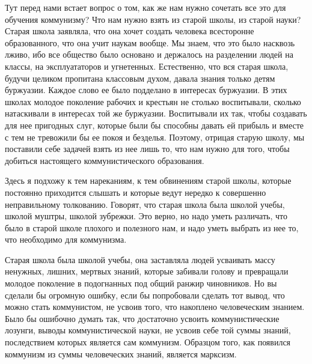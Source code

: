 \documentclass[12pt]{article}
\newcommand{\parnum}{(\arabic{parcount})}
\newcounter{parcount}
\newenvironment{parnumbers}{%
  \par%
  \everypar{\noindent \stepcounter{parcount}\marginpar[]{\parnum}}%
}{}
\begin{document}
\begin{parnumbers}
Тут перед нами встает вопрос о том, как же нам нужно сочетать все это для обучения коммунизму? Что нам нужно взять из старой школы, из старой науки? Старая школа заявляла, что она хочет создать человека всесторонне образованного, что она учит наукам вообще. Мы знаем, что это было насквозь лживо, ибо все общество было основано и держалось на разделении людей на классы, на эксплуататоров и угнетенных. Естественно, что вся старая школа, будучи целиком пропитана классовым духом, давала знания только детям буржуазии. Каждое слово ее было подделано в интересах буржуазии. В этих школах молодое поколение рабочих и крестьян не столько воспитывали, сколько натаскивали в интересах той же буржуазии. Воспитывали их так, чтобы создавать для нее пригодных слуг, которые были бы способны давать ей прибыль и вместе с тем не тревожили бы ее покоя и безделья. Поэтому, отрицая старую школу, мы поставили себе задачей взять из нее лишь то, что нам нужно для того, чтобы добиться настоящего коммунистического образования.

Здесь я подхожу к тем нареканиям, к тем обвинениям старой школы, которые постоянно приходится слышать и которые ведут нередко к совершенно неправильному толкованию. Говорят, что старая школа была школой учебы, школой муштры, школой зубрежки. Это верно, но надо уметь различать, что было в старой школе плохого и полезного нам, и надо уметь выбрать из нее то, что необходимо для коммунизма.

Старая школа была школой учебы, она заставляла людей усваивать массу ненужных, лишних, мертвых знаний, которые забивали голову и превращали молодое поколение в подогнанных под общий ранжир чиновников. Но вы сделали бы огромную ошибку, если бы попробовали сделать тот вывод, что можно стать коммунистом, не усвоив того, что накоплено человеческим знанием. Было бы ошибочно думать так, что достаточно усвоить коммунистические лозунги, выводы коммунистической науки, не усвоив себе той суммы знаний, последствием которых является сам коммунизм. Образцом того, как появился коммунизм из суммы человеческих знаний, является марксизм.


\end{parnumbers}
\end{document}
